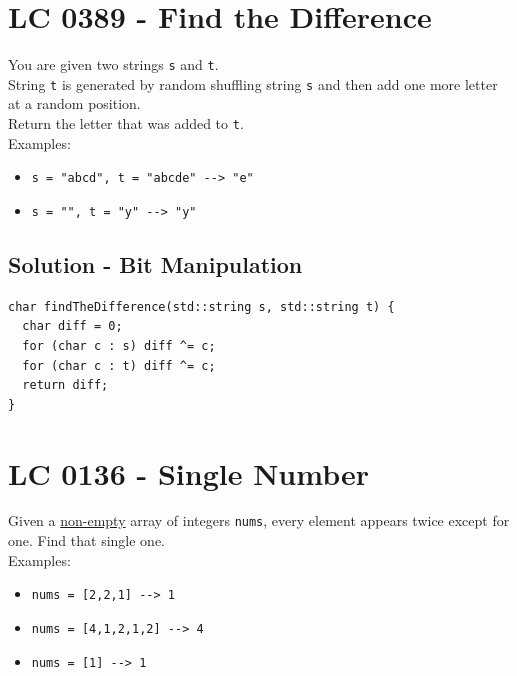 \section{LC 0389 - Find the Difference}
You are given two strings {\colorbox{CodeBackground}{\lstinline|s|}} and {\colorbox{CodeBackground}{\lstinline|t|}}.\\

String {\colorbox{CodeBackground}{\lstinline|t|}} is generated by random shuffling string {\colorbox{CodeBackground}{\lstinline|s|}} and then add one more letter at a random position.\\

Return the letter that was added to {\colorbox{CodeBackground}{\lstinline|t|}}.\\

Examples:
\begin{itemize}
\item {\colorbox{CodeBackground}{\lstinline|s = "abcd", t = "abcde" --> "e"|}}
\item {\colorbox{CodeBackground}{\lstinline|s = "", t = "y" --> "y"|}}
\end{itemize}

\subsection*{Solution - Bit Manipulation}
\begin{lstlisting}
char findTheDifference(std::string s, std::string t) {
  char diff = 0;
  for (char c : s) diff ^= c;
  for (char c : t) diff ^= c;
  return diff;
}
\end{lstlisting}

\section{LC 0136 - Single Number}
Given a \ul{non-empty} array of integers {\colorbox{CodeBackground}{\lstinline|nums|}}, every element appears twice except for one. Find that single one.\\

Examples:
\begin{itemize}
\item {\colorbox{CodeBackground}{\lstinline|nums = [2,2,1] --> 1|}}
\item {\colorbox{CodeBackground}{\lstinline|nums = [4,1,2,1,2] --> 4|}}
\item {\colorbox{CodeBackground}{\lstinline|nums = [1] --> 1|}}
\end{itemize}

